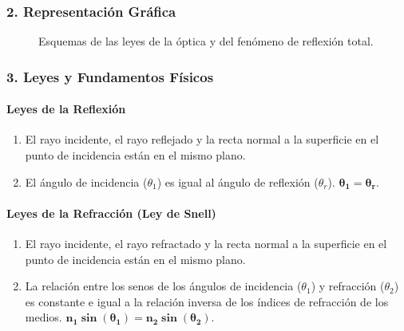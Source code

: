 \subsubsection*{2. Representación Gráfica}
\begin{figure}[H]
    \centering
    \hfill
    \caption{Esquemas de las leyes de la óptica y del fenómeno de reflexión total.}
\end{figure}

\subsubsection*{3. Leyes y Fundamentos Físicos}
\paragraph*{Leyes de la Reflexión}
\begin{enumerate}
    \item El rayo incidente, el rayo reflejado y la recta normal a la superficie en el punto de incidencia están en el mismo plano.
    \item El ángulo de incidencia ($\theta_1$) es igual al ángulo de reflexión ($\theta_r$). $\boldsymbol{\theta_1 = \theta_r}$.
\end{enumerate}

\paragraph*{Leyes de la Refracción (Ley de Snell)}
\begin{enumerate}
    \item El rayo incidente, el rayo refractado y la recta normal a la superficie en el punto de incidencia están en el mismo plano.
    \item La relación entre los senos de los ángulos de incidencia ($\theta_1$) y refracción ($\theta_2$) es constante e igual a la relación inversa de los índices de refracción de los medios. $\boldsymbol{n_1 \sin(\theta_1) = n_2 \sin(\theta_2)}$.
\end{enumerate}

